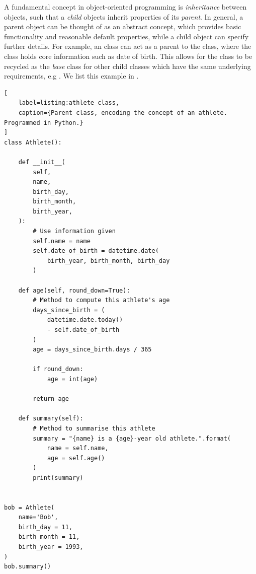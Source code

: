 A fundamental concept in object-oriented programming is \emph{inheritance} between objects, 
    such that a \emph{child} objects inherit properties of its \emph{parent}.
In general, a parent object can be thought of as an abstract concept, 
    which provides basic functionality and reasonable default properties,
    while a child object can specify further details. 
For example, an  class can act as a parent to the  class, 
    where the  class holds core information such as date of birth. 
This allows for the  class to be recycled as the \emph{base} class for other child classes
    which have the same underlying requirements, e.g . 
We list this example in . 

\begin{lstlisting}[
    label=listing:athlete_class,
    caption={Parent class, encoding the concept of an athlete. Programmed in Python.}
]
class Athlete():
    
    def __init__(
        self, 
        name, 
        birth_day, 
        birth_month, 
        birth_year, 
    ):
        # Use information given
        self.name = name
        self.date_of_birth = datetime.date(
            birth_year, birth_month, birth_day
        )
        
    def age(self, round_down=True):
        # Method to compute this athlete's age
        days_since_birth = ( 
            datetime.date.today() 
            - self.date_of_birth
        )
        age = days_since_birth.days / 365
        
        if round_down:
            age = int(age)
        
        return age
    
    def summary(self):
        # Method to summarise this athlete
        summary = "{name} is a {age}-year old athlete.".format(
            name = self.name, 
            age = self.age()
        )
        print(summary)
        
        
bob = Athlete(
    name='Bob',
    birth_day = 11,
    birth_month = 11, 
    birth_year = 1993, 
)
bob.summary()    
\end{lstlisting}

